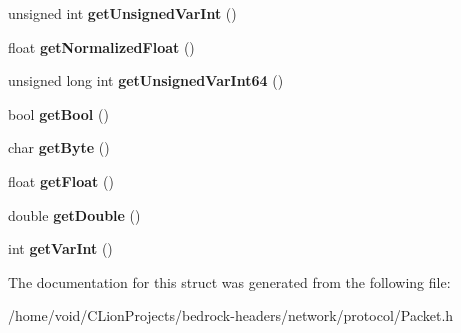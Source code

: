 \begin{DoxyCompactItemize}
unsigned int {\bfseries get\+Unsigned\+Var\+Int} ()
\item 
\mbox{\label{struct_read_only_binary_stream_a8fdd900673e467ee62c6d7803bb6cb4b}} 
float {\bfseries get\+Normalized\+Float} ()
\item 
\mbox{\label{struct_read_only_binary_stream_a1018a0c8850680b156654a625d29abc9}} 
unsigned long int {\bfseries get\+Unsigned\+Var\+Int64} ()
\item 
\mbox{\label{struct_read_only_binary_stream_a634f16b5f27a49f2a6e7d717292210e8}} 
bool {\bfseries get\+Bool} ()
\item 
\mbox{\label{struct_read_only_binary_stream_ac4cda3736bfe105857e6a62b27d18a96}} 
char {\bfseries get\+Byte} ()
\item 
\mbox{\label{struct_read_only_binary_stream_a89c74b0a7f274bf80b10d6fda95d5656}} 
float {\bfseries get\+Float} ()
\item 
\mbox{\label{struct_read_only_binary_stream_a82856327ab9b7b998e3b1173ffa2e154}} 
double {\bfseries get\+Double} ()
\item 
\mbox{\label{struct_read_only_binary_stream_a7ea15f18c351bfe7e35918f3c1fa8c75}} 
int {\bfseries get\+Var\+Int} ()
\end{DoxyCompactItemize}


The documentation for this struct was generated from the following file\+:\begin{DoxyCompactItemize}
\item 
/home/void/\+C\+Lion\+Projects/bedrock-\/headers/network/protocol/Packet.\+h\end{DoxyCompactItemize}
